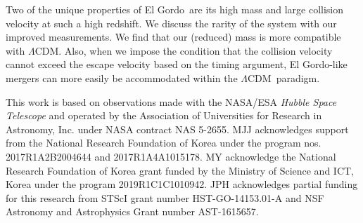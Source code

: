 \documentclass[twocolumn]{aastex631}
\newcommand{\elgordo}{El Gordo}
\newcommand{\LCDM}{$\Lambda$CDM}
\begin{document}
Two of the unique properties of \elgordo~are its high mass and large collision velocity at such a high redshift. We discuss the rarity of the system with our improved measurements. We find that our (reduced) mass is more compatible with \LCDM. 
Also, when we impose the condition that the collision velocity cannot exceed the escape velocity based on the timing argument, \elgordo-like mergers can more easily be accommodated within the \LCDM~paradigm.



This work is based on observations made with the NASA/ESA {\it Hubble Space Telescope} and operated by the Association of Universities for Research in Astronomy, Inc. under NASA contract NAS 5-2655. MJJ acknowledges support from the National Research Foundation of Korea under the program nos. 2017R1A2B2004644 and 2017R1A4A1015178. 
MY acknowledge the National Research Foundation of Korea grant funded by the Ministry of Science and ICT, Korea under the program 2019R1C1C1010942. 
JPH acknowledges partial funding for this research from STScI grant number HST-GO-14153.01-A and NSF Astronomy and Astrophysics Grant number AST-1615657.



\clearpage


\end{document}
